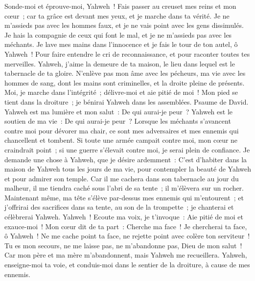 \begin{multicols}{2}
Sonde-moi et éprouve-moi, Yahweh~! Fais passer au creuset mes reins et mon cœur~;
car ta grâce est devant mes yeux, et je marche dans ta vérité.
Je ne m'assieds pas avec les hommes faux, et je ne vais point avec les gens dissimulés.
Je hais la compagnie de ceux qui font le mal, et je ne m'assieds pas avec les méchants.
Je lave mes mains dans l'innocence et je fais le tour de ton autel, ô Yahweh~!
Pour faire entendre le cri de reconnaissance, et pour raconter toutes tes merveilles.
Yahweh, j'aime la demeure de ta maison, le lieu dans lequel est le tabernacle de ta gloire.
N'enlève pas mon âme avec les pécheurs, ma vie avec les hommes de sang,
dont les mains sont criminelles, et la droite pleine de présents.
Moi, je marche dans l'intégrité~; délivre-moi et aie pitié de moi~!
Mon pied se tient dans la droiture~; je bénirai Yahweh dans les assemblées.
\VerseOne{}Psaume de David. Yahweh est ma lumière et mon salut~: De qui aurai-je peur~? Yahweh est le soutien de ma vie~: De qui aurai-je peur~?
Lorsque les méchants s'avancent contre moi pour dévorer ma chair, ce sont mes adversaires et mes ennemis qui chancellent et tombent.
Si toute une armée campait contre moi, mon cœur ne craindrait point~; si une guerre s'élevait contre moi, je serai plein de confiance.
Je demande une chose à Yahweh, que je désire ardemment~: C'est d'habiter dans la maison de Yahweh tous les jours de ma vie, pour contempler la beauté de Yahweh et pour admirer son temple.
Car il me cachera dans son tabernacle au jour du malheur, il me tiendra caché sous l'abri de sa tente~; il m'élèvera sur un rocher.
Maintenant même, ma tête s'élève par-dessus mes ennemis qui m'entourent~; et j'offrirai des sacrifices dans sa tente, au son de la trompette~; je chanterai et célèbrerai Yahweh.
Yahweh~! Ecoute ma voix, je t'invoque~: Aie pitié de moi et exauce-moi~!
Mon cœur dit de ta part~: Cherche ma face~! Je chercherai ta face, ô Yahweh~!
Ne me cache point ta face, ne rejette point avec colère ton serviteur~! Tu es mon secours, ne me laisse pas, ne m'abandonne pas, Dieu de mon salut~!
Car mon père et ma mère m'abandonnent, mais Yahweh me recueillera.
Yahweh, enseigne-moi ta voie, et conduis-moi dans le sentier de la droiture, à cause de mes ennemis.

\end{multicols}
